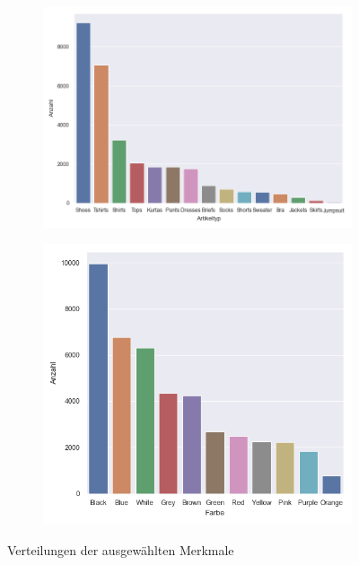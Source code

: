 \begin{figure}[H]
\begin{subfigure}[c]{0.155\linewidth}
	\end{subfigure}
	\begin{subfigure}[c]{0.45\linewidth}
		\includegraphics[width=\linewidth]{images/articleType.png}
	\end{subfigure}
	\begin{subfigure}[c]{0.355\linewidth}
		\includegraphics[width=\linewidth]{images/baseColour.png}
	\end{subfigure}
	\caption{Verteilungen der ausgewählten Merkmale}
	\label{fig:evaluation}
\end{figure}

